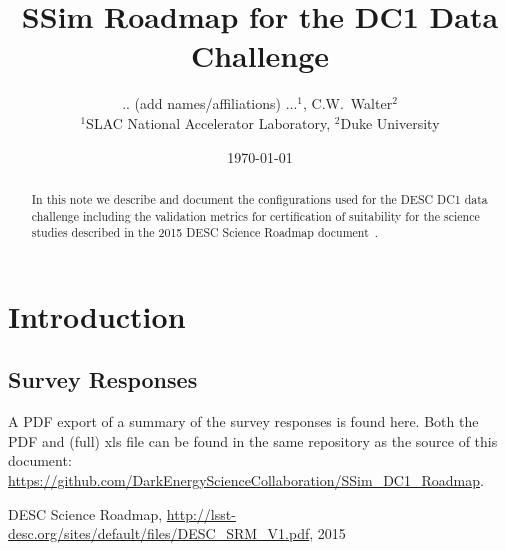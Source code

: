 \documentclass[12pt,letterpaper]{article}
\begin{document}

\title{SSim Roadmap for the DC1 Data Challenge}
\author{ .. (add names/affiliations) ...$^1$, C.W.~Walter$^2$ \\
{\small $^1$SLAC National Accelerator Laboratory, $^2$Duke University}}

\date{\today}

\maketitle

\begin{abstract}
  In this note we describe and document the configurations used for
  the DESC DC1 data challenge including the validation metrics for
  certification of suitability for the science studies described in
  the 2015 DESC Science Roadmap document~\cite{SRM:2015}.
\end{abstract}

\noindent
\begin{center}
  \fboxsep=5pt  
  \end{center} 
\vspace{0.1in}

\section{Introduction}


\begin{appendices}

\section{Survey Responses}

A PDF export of a summary of the survey responses is found here.  Both
the PDF and (full) xls file can be found in the same repository as the
source of this document:
\url{https://github.com/DarkEnergyScienceCollaboration/SSim_DC1_Roadmap}.

 

\end{appendices}

\begin{thebibliography}{100}

DESC Science Roadmap,
\url{http://lsst-desc.org/sites/default/files/DESC_SRM_V1.pdf}, 2015

\end{thebibliography}
\end{document}
